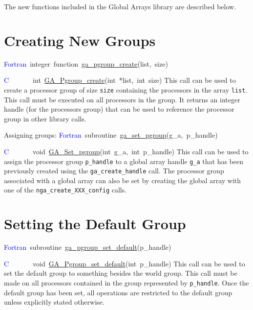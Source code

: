 The new functions included in the Global Arrays library are described
below. 


\section{Creating New Groups}
\textcolor{blue}{Fortran}~integer~function~\href{http://www.emsl.pnl.gov/docs/global/ga_ops.html\#GA_PGROUP_CREATE}{ga\_{}pgroup\_{}create}(list,~size)

\textcolor{blue}{C}~~~~~~~int~\href{http://www.emsl.pnl.gov/docs/global/c_nga_ops.html\#GA_PGROUP_CREATE}{GA\_{}Pgroup\_{}create}(int~{*}list,~int~size)
This call can be used to create a processor group of size \texttt{size}
containing the processors in the array \texttt{list}. This call must
be executed on all processors in the group. It returns an integer
handle (for the processors group) that can be used to reference the
processor group in other library calls.

Assigning groups:
\textcolor{blue}{Fortran}~subroutine~\href{http://www.emsl.pnl.gov/docs/global/ga_ops.html\#GA_SET_PGROUP}{ga\_{}set\_{}pgroup}(g\_a,~p\_handle)

\textcolor{blue}{C}~~~~~~~void~\href{http://www.emsl.pnl.gov/docs/global/c_nga_ops.html\#GA_SET_PGROUP}{GA\_{}Set\_{}pgroup}(int~g\_a,~int~p\_handle)
This call can be used to assign the processor group \texttt{p\_handle}
to a global array handle \texttt{g\_a} that has been previously created
using the \texttt{ga\_create\_handle} call. The processor group associated
with a global array can also be set by creating the global array with
one of the \texttt{nga\_create\_XXX\_config} calls. 


\section{Setting the Default Group}
\textcolor{blue}{Fortran}~subroutine~\href{http://www.emsl.pnl.gov/docs/global/ga_ops.html\#GA_PGROUP_SET_DEFAULT}{ga\_{}pgroup\_{}set\_{}default}(p\_handle)

\textcolor{blue}{C}~~~~~~~void~\href{http://www.emsl.pnl.gov/docs/global/c_nga_ops.html\#GA_PGROUP_SET_DEFAULT}{GA\_{}Pgroup\_{}set\_{}default}(int~p\_handle)
This call can be used to set the default group to something besides
the world group. This call must be made on all processors contained
in the group represented by \texttt{p\_handle}. Once the default group
has been set, all operations are restricted to the default group unless
explicitly stated otherwise. 


